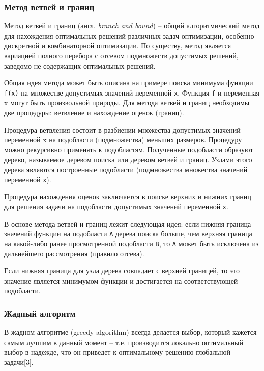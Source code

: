 \documentclass[14pt,a4paper]{extarticle}
\begin{document}
	\subsubsection{Метод ветвей и границ}
	
		Метод ветвей и границ (англ. \emph{branch and bound}) -- общий алгоритмический метод для нахождения оптимальных решений различных задач оптимизации, особенно дискретной и комбинаторной оптимизации. По существу, метод является вариацией полного перебора с отсевом подмножеств допустимых решений, заведомо не содержащих оптимальных решений.

		Общая идея метода может быть описана на примере поиска минимума функции \texttt{f(x)} на множестве допустимых значений переменной \texttt{x}. Функция \texttt{f} и переменная x могут быть произвольной природы. Для метода ветвей и границ необходимы две процедуры: ветвление и нахождение оценок (границ).

		Процедура ветвления состоит в разбиении множества допустимых значений переменной x на подобласти (подмножества) меньших размеров. Процедуру можно рекурсивно применять к подобластям. Полученные подобласти образуют дерево, называемое деревом поиска или деревом ветвей и границ. Узлами этого дерева являются построенные подобласти (подмножества множества значений переменной \texttt{x}).

		Процедура нахождения оценок заключается в поиске верхних и нижних границ для решения задачи на подобласти допустимых значений переменной \texttt{x}.

		В основе метода ветвей и границ лежит следующая идея: если нижняя граница значений функции на подобласти \texttt{A} дерева поиска больше, чем верхняя граница на какой-либо ранее просмотренной подобласти \texttt{B}, то \texttt{A} может быть исключена из дальнейшего рассмотрения (правило отсева).

		Если нижняя граница для узла дерева совпадает с верхней границей, то это значение является минимумом функции и достигается на соответствующей подобласти.


	\subsubsection{Жадный алгоритм}
	
	В жадном алгоритме (greedy algorithm) всегда делается выбор, который кажется самым лучшим в данный момент -- т.е. производится локально оптимальный выбор в надежде, что он приведет к оптимальному решению глобальной задачи[3].
	
\end{document}
